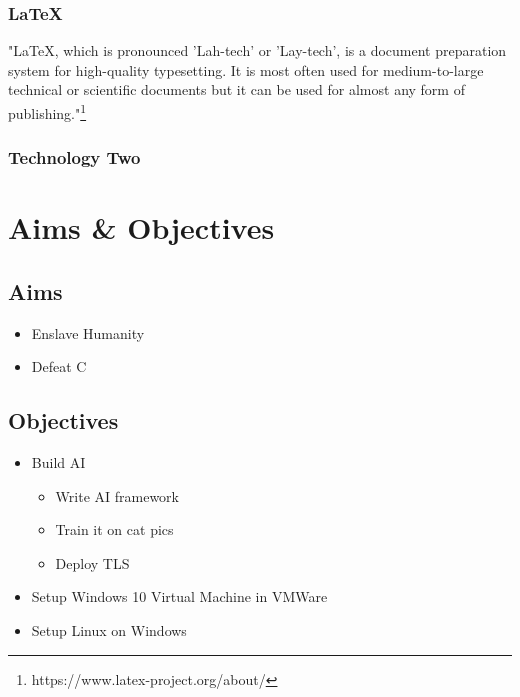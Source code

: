 \documentclass[12pt,a4paper]{article}
\begin{document}
			\subsubsection{LaTeX}
			"LaTeX, which is pronounced 'Lah-tech' or 'Lay-tech', is a document preparation system for high-quality typesetting. It is most often used for medium-to-large technical or scientific documents but it can be used for almost any form of publishing."\footnote{https://www.latex-project.org/about/}
			
			\subsubsection{Technology Two}
						
	\newpage	


	\section{Aims \& Objectives}
				
		\subsection{Aims}
			\begin{itemize}
				\item{Enslave Humanity}
				\item{Defeat C}
			\end{itemize}
				
		\subsection{Objectives}
			\begin{itemize}
				\item{Build AI}
					\begin{itemize}
						\item{Write AI framework}
						\item{Train it on cat pics}
						\item{Deploy TLS}
					\end{itemize}
					\item{Setup Windows 10 Virtual Machine in VMWare}
					\item{Setup Linux on Windows}
				\end{itemize}

	\clearpage
				
\end{document}
